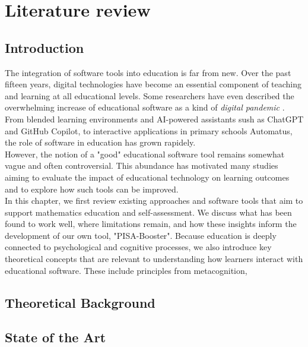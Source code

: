 \chapter{Literature review}


\section{Introduction}
The integration of software tools into education is far from new. Over the past fifteen years, digital technologies have become an essential component of teaching and learning at all educational levels.
Some researchers have even described the overwhelming increase of educational software as a kind of \textit{digital pandemic} \cite{dancsa_digital_2023}.
From blended learning environments and AI-powered assistants sush as ChatGPT and GitHub Copilot, to interactive applications in primary schools Automatus, the role of software in education has grown rapidely. \\

However, the notion of a "good" educational software tool remains somewhat vague and often controversial. 
This abundance has motivated many studies aiming to evaluate the impact of educational technology on learning outcomes and to explore how such tools can be improved. \\

In this chapter, we first review existing approaches and software tools that aim to support mathematics education and self-assessment. 
We discuss what has been found to work well, where limitations remain, and how these insights inform the development of our own tool, "PISA-Booster". 
Because education is deeply connected to psychological and cognitive processes, we also introduce key theoretical concepts that are relevant to understanding how learners interact with educational software.
These include principles from metacognition, 

\section{Theoretical Background}

\section{State of the Art}

\